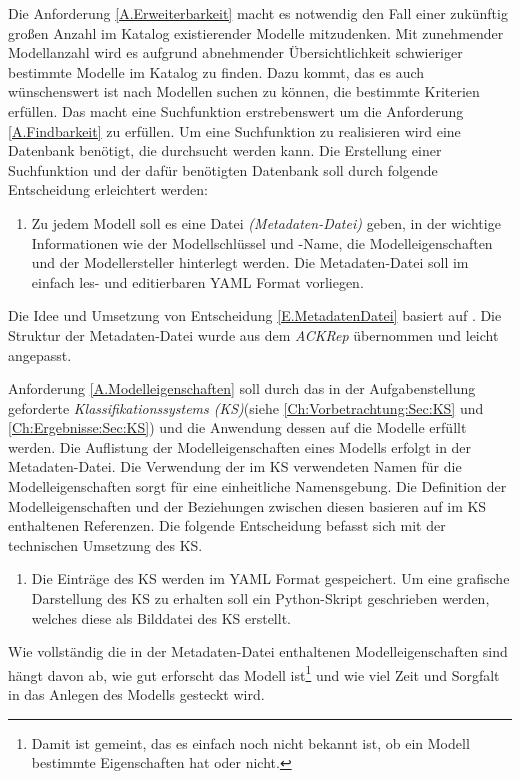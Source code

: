 Die Anforderung \ref{A.Erweiterbarkeit} macht es notwendig den Fall einer zukünftig großen Anzahl im Katalog existierender Modelle mitzudenken. Mit zunehmender Modellanzahl wird es aufgrund abnehmender Übersichtlichkeit schwieriger bestimmte Modelle im Katalog zu finden. Dazu kommt, das es auch wünschenswert ist nach Modellen suchen zu können, die bestimmte Kriterien erfüllen. Das macht eine Suchfunktion erstrebenswert um die Anforderung \ref{A.Findbarkeit} zu erfüllen. Um eine Suchfunktion zu realisieren wird eine Datenbank benötigt, die durchsucht werden kann. Die Erstellung einer Suchfunktion und der dafür benötigten Datenbank soll durch folgende Entscheidung erleichtert werden:
\begin{enumerate}[label=\textbf{Entscheidung E.\arabic*}:, ref=\textbf{E.\arabic*}, wide=0pt, leftmargin=*]
	\item \label{E.MetadatenDatei}Zu jedem Modell soll es eine Datei \textit{(Metadaten-Datei)} geben, in der wichtige Informationen wie der Modellschlüssel und -Name, die Modelleigenschaften und der Modellersteller hinterlegt werden. Die Metadaten-Datei soll im einfach les- und editierbaren YAML Format vorliegen.
\end{enumerate}
Die Idee und Umsetzung von Entscheidung \ref{E.MetadatenDatei} basiert auf \cite{KNHE20a}. Die Struktur der Metadaten-Datei wurde aus dem \textit{ACKRep} übernommen und leicht angepasst.

Anforderung \ref{A.Modelleigenschaften} soll durch das in der Aufgabenstellung geforderte \textit{Klassifikationssystems (KS)}(siehe \autoref{Ch:Vorbetrachtung:Sec:KS} und \autoref{Ch:Ergebnisse:Sec:KS}) und die Anwendung dessen auf die Modelle erfüllt werden. Die Auflistung der Modelleigenschaften eines Modells erfolgt in der Metadaten-Datei. Die Verwendung der im KS verwendeten Namen für die Modelleigenschaften sorgt für eine einheitliche Namensgebung. Die Definition der Modelleigenschaften und der Beziehungen zwischen diesen basieren auf im KS enthaltenen Referenzen. Die folgende Entscheidung befasst sich mit der technischen Umsetzung des KS.
\begin{enumerate}[resume*]
	\item \label{E.KS_TechUmsetzung}Die Einträge des KS werden im YAML Format gespeichert. Um eine grafische Darstellung des KS zu erhalten soll ein Python-Skript geschrieben werden, welches diese als Bilddatei des KS erstellt.
\end{enumerate}
Wie vollständig die in der Metadaten-Datei enthaltenen Modelleigenschaften sind hängt davon ab, wie gut erforscht das Modell ist\footnote{Damit ist gemeint, das es einfach noch nicht bekannt ist, ob ein Modell bestimmte Eigenschaften hat oder nicht.} und wie viel Zeit und Sorgfalt in das Anlegen des Modells gesteckt wird. %

